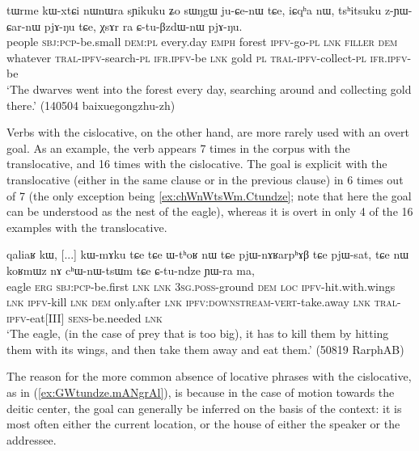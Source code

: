 \begin{exe}
\ex \label{ex:CtuBzdWnW} 
\gll tɯrme kɯ-xtɕi nɯnɯra sɲikuku ʑo sɯŋgɯ ju-ɕe-nɯ tɕe, iɕqʰa nɯ, tsʰitsuku z-ɲɯ-ɕar-nɯ pjɤ-ŋu tɕe, χsɤr ra ɕ-tu-βzdɯ-nɯ pjɤ-ŋu. \\
people \textsc{sbj}:\textsc{pcp}-be.small \textsc{dem}:\textsc{pl} every.day \textsc{emph} forest \textsc{ipfv}-go-\textsc{pl} \textsc{lnk} \textsc{filler} \textsc{dem} whatever \textsc{tral}-\textsc{ipfv}-search-\textsc{pl} \textsc{ifr}.\textsc{ipfv}-be \textsc{lnk} gold \textsc{pl} \textsc{tral}-\textsc{ipfv}-collect-\textsc{pl} \textsc{ifr}.\textsc{ipfv}-be \\
\glt `The dwarves went into the forest every day, searching around and collecting gold there.' (140504 baixuegongzhu-zh)
\end{exe} 

Verbs with the cislocative, on the other hand, are more rarely used with an overt goal. As an example, the verb  appears 7 times in the corpus with the translocative, and 16 times with the cislocative. The goal is explicit with the translocative (either in the same clause or in the previous clause) in 6 times out of 7 (the only exception being \ref{ex:chWnWtsWm.Ctundze}; note that here the goal can be understood as the nest of the eagle), whereas it is overt in only 4 of the 16 examples with the translocative.

\begin{exe}
\ex \label{ex:chWnWtsWm.Ctundze}
\gll qaliaʁ kɯ, [...] kɯ-mɤku tɕe tɕe ɯ-tʰoʁ nɯ tɕe pjɯ-nɤʁarpʰɤβ tɕe pjɯ-sat,  tɕe nɯ koʁmɯz nɤ cʰɯ-nɯ-tsɯm tɕe ɕ-tu-ndze ɲɯ-ra ma, \\
eagle \textsc{erg} { } \textsc{sbj}:\textsc{pcp}-be.first \textsc{lnk} \textsc{lnk} \textsc{3sg}.\textsc{poss}-ground \textsc{dem} \textsc{loc} \textsc{ipfv}-hit.with.wings \textsc{lnk} \textsc{ipfv}-kill \textsc{lnk} \textsc{dem}  only.after \textsc{lnk} \textsc{ipfv}:\textsc{downstream}-\textsc{vert}-take.away \textsc{lnk} \textsc{tral}-\textsc{ipfv}-eat[III] \textsc{sens}-be.needed \textsc{lnk} \\
\glt `The eagle, (in the case of prey that is too big), it has to kill them by hitting them with its wings, and then take them away and  eat them.' (50819 RarphAB)
\end{exe}

The reason for the more common absence of locative phrases with the cislocative, as in (\ref{ex:GWtundze.mANgrAl}), is because in the case of motion towards the deitic center, the goal can generally be inferred on the basis of the context: it is most often either the current location, or the house of either the speaker or the addressee.

